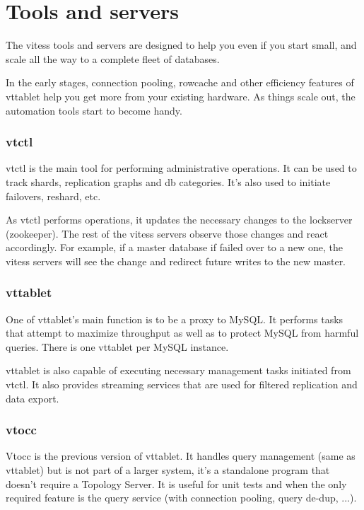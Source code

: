 \section{Tools and servers}\label{Tools-and-Servers}

The vitess tools and servers are designed to help you even
if you start small, and scale all the way to a complete fleet
of databases.

In the early stages, connection pooling, rowcache and other
efficiency features of vttablet help you get more from your
existing hardware.
As things scale out, the automation tools start to become handy.

\subsubsection{vtctl}\hypertarget{vtctl}{}\label{vtctl}

vtctl is the main tool for performing administrative operations.
It can be used to track shards, replication graphs and
db categories.
It's also used to initiate failovers, reshard, etc.

As vtctl performs operations, it updates the necessary
changes to the lockserver (zookeeper).
The rest of the vitess servers observe those changes
and react accordingly.
For example, if a master database if failed over to a new
one, the vitess servers will see the change and redirect
future writes to the new master.

\subsubsection{vttablet}\hypertarget{vttablet}{}\label{vttablet}

One of vttablet's main function is to be a proxy to MySQL.
It performs tasks that attempt to maximize throughput as
well as to protect MySQL from harmful queries. There is
one vttablet per MySQL instance.

vttablet is also capable of executing necessary management
tasks initiated from vtctl.
It also provides streaming services that are used for
filtered replication and data export.

\subsubsection{vtocc}\hypertarget{vtocc}{}\label{vtocc}

Vtocc is the previous version of vttablet. It handles query management
(same as vttablet) but is not part of a larger system, it's a standalone
program that doesn't require a Topology Server. It is useful for
unit tests and when the only required feature is the query service
(with connection pooling, query de-dup, ...).

